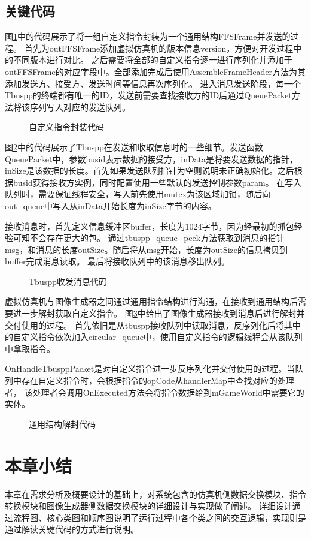 \subsection{关键代码}
图\ref{IGsend}中的代码展示了将一组自定义指令封装为一个通用结构FFSFrame并发送的过程。
首先为outFFSFrame添加虚拟仿真机的版本信息version，方便对开发过程中的不同版本进行对比。
之后需要将全部的自定义指令逐一进行序列化并添加于outFFSFrame的对应字段中。全部添加完成后使用AssembleFrameHeader方法为其添加发送方、接受方、发送时间等信息再次序列化。
进入消息发送阶段，每一个Tbuspp的终端都有唯一的ID，发送前需要查找接收方的ID后通过QueuePacket方法将该序列写入对应的发送队列。
\begin{figure}[h!]
    \begin{center}
        
        \caption{自定义指令封装代码}
        \label{IGsend}
    \end{center}
\end{figure}
\par
图\ref{tbusio}中的代码展示了Tbuspp在发送和收取信息时的一些细节。发送函数QueuePacket中，参数busid表示数据的接受方，inData是将要发送数据的指针，
inSize是该数据的长度。首先如果发送队列指针为空则说明未正确初始化。之后根据busid获得接收方实例，同时配置使用一些默认的发送控制参数param。
在写入队列时，需要保证线程安全，写入前先使用mutex为该区域加锁，随后向out\_queue中写入从inData开始长度为inSize字节的内容。
\par
接收消息时，首先定义信息缓冲区buffer，长度为1024字节，因为经最初的抓包经验可知不会存在更大的包。
通过tbuspp\_queue\_peek方法获取到消息的指针msg，和消息的长度outSize。随后将从msg开始，长度为outSize的信息拷贝到buffer完成消息读取。
最后将接收队列中的该消息移出队列。
\begin{figure}[h!]
    \begin{center}
        
        \caption{Tbuspp收发消息代码}
        \label{tbusio}
    \end{center}
\end{figure}
\par
虚拟仿真机与图像生成器之间通过通用指令结构进行沟通，在接收到通用结构后需要进一步解封获取自定义指令。
图\ref{IGrecv}中给出了图像生成器接收到消息后进行解封并交付使用的过程。
首先依旧是从tbuspp接收队列中读取消息，反序列化后将其中的自定义指令依次加入circular\_queue中，使用自定义指令的逻辑线程会从该队列中拿取指令。
\par
OnHandleTbusppPacket是对自定义指令进一步反序列化并交付使用的过程。当队列中存在自定义指令时，会根据指令的opCode从handlerMap中查找对应的处理者，
该处理者会调用OnExecuted方法会将指令数据给到mGameWorld中需要它的实体。
\begin{figure}[h!]
    \begin{center}
        
        \caption{通用结构解封代码}
        \label{IGrecv}
    \end{center}
\end{figure}


\section{本章小结}
本章在需求分析及概要设计的基础上，对系统包含的仿真机侧数据交换模块、指令转换模块和图像生成器侧数据交换模块的详细设计与实现做了阐述。
详细设计通过流程图、核心类图和顺序图说明了运行过程中各个类之间的交互逻辑，实现则是通过解读关键代码的方式进行说明。
